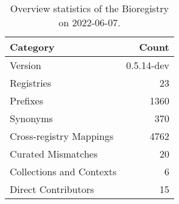 \begin{table}
\centering
\caption{Overview statistics of the Bioregistry on 2022-06-07.}
\label{tab:bioregistry-summary}
\begin{tabular}{lr}
\toprule
                Category &      Count \\
\midrule
                 Version & 0.5.14-dev \\
              Registries &         23 \\
                Prefixes &       1360 \\
                Synonyms &        370 \\
 Cross-registry Mappings &       4762 \\
      Curated Mismatches &         20 \\
Collections and Contexts &          6 \\
     Direct Contributors &         15 \\
\bottomrule
\end{tabular}
\end{table}
